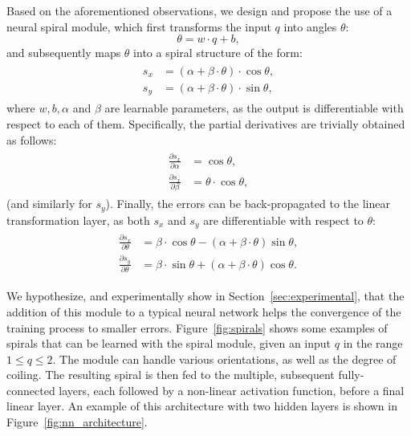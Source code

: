 \documentclass[preprint,12pt]{elsarticle}
\begin{document}
Based on the aforementioned observations, we design and propose the use of a neural spiral module, which first transforms the input $q$ into angles $\theta$:
\begin{equation}
    \label{eq:theta}
    \theta = w\cdot q + b,
\end{equation}
and subsequently maps $\theta$ into a spiral structure of the form:
\begin{align}
  \begin{split}
  \label{eq:spiral}
    s_x &= (\alpha + \beta\cdot\theta) \cdot \cos\theta, \\
    s_y &= (\alpha + \beta\cdot\theta) \cdot \sin \theta,
  \end{split}
\end{align}
where $w, b, \alpha$ and $\beta$ are learnable parameters, as the output is differentiable with respect to each of them. Specifically, the partial derivatives are trivially obtained as follows:
\begin{align}
  \begin{split}
  \label{eq:spiral_params_der}
    \frac{\partial s_x}{\partial \alpha} &= \cos\theta, \\
    \frac{\partial s_x}{\partial \beta} &= \theta\cdot \cos\theta,
  \end{split}
\end{align}
(and similarly for $s_y$). Finally, the errors can be back-propagated to the linear transformation layer, as both $s_x$ and $s_y$ are differentiable with respect to $\theta$:
\begin{align}
  \begin{split}
  \label{eq:spiral_theta_der}
    \frac{\partial s_x}{\partial \theta} &= \beta\cdot\cos\theta - (\alpha + \beta\cdot\theta) \sin\theta, \\
    \frac{\partial s_y}{\partial \theta} &= \beta\cdot\sin\theta + (\alpha + \beta\cdot\theta) \cos\theta.
  \end{split}
\end{align}

We hypothesize, and experimentally show in Section~\ref{sec:experimental}, that the addition of this module to a typical neural network helps the convergence of the training process to smaller errors. Figure~\ref{fig:spirals} shows some examples of spirals that can be learned with the spiral module, given an input $q$ in the range $1\leq q \leq 2$. The module can handle various orientations, as well as the degree of coiling. The resulting spiral is then fed to the multiple, subsequent fully-connected layers, each followed by a non-linear activation function, before a final linear layer. An example of this architecture with two hidden layers is shown in Figure~\ref{fig:nn_architecture}.
\end{document}
